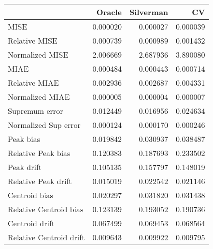 \begin{tabular}{lrrr}
  \toprule
 & Oracle & Silverman & CV \\ 
  \midrule
MISE & 0.000020 & 0.000027 & 0.000039 \\ 
  Relative MISE & 0.000739 & 0.000989 & 0.001432 \\ 
  Normalized MISE & 2.006669 & 2.687936 & 3.890080 \\ 
  MIAE & 0.000484 & 0.000443 & 0.000714 \\ 
  Relative MIAE & 0.002936 & 0.002687 & 0.004331 \\ 
  Normalized MIAE & 0.000005 & 0.000004 & 0.000007 \\ 
  Supremum error & 0.012449 & 0.016956 & 0.024634 \\ 
  Normalized Sup error & 0.000124 & 0.000170 & 0.000246 \\ 
  Peak bias & 0.019842 & 0.030937 & 0.038487 \\ 
  Relative Peak bias & 0.120383 & 0.187693 & 0.233502 \\ 
  Peak drift & 0.105135 & 0.157797 & 0.148019 \\ 
  Relative Peak drift & 0.015019 & 0.022542 & 0.021146 \\ 
  Centroid bias & 0.020297 & 0.031820 & 0.031438 \\ 
  Relative Centroid bias & 0.123139 & 0.193052 & 0.190736 \\ 
  Centroid drift & 0.067499 & 0.069453 & 0.068564 \\ 
  Relative Centroid drift & 0.009643 & 0.009922 & 0.009795 \\ 
   \bottomrule
\end{tabular}
